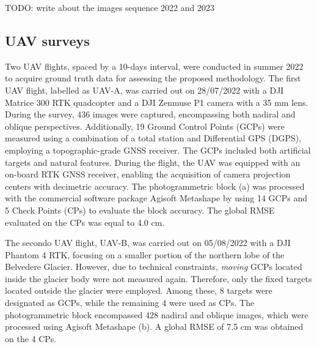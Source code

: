   {\color{red} TODO: write about the images sequence 2022 and 2023}

\subsection{UAV surveys}\label{sec:4:uavsurveys}

Two UAV flights, spaced by a 10-days interval, were conducted in summer 2022 to acquire
ground truth data for assessing the proposed methodology.
The first UAV flight, labelled as UAV-A, was carried out on 28/07/2022 with a DJI
Matrice 300 RTK quadcopter and a DJI Zenmuse P1 camera with a 35 mm lens.
During the survey, 436 images were captured, encompassing both nadiral and oblique
perspectives.
Additionally, 19 Ground Control Points (GCPs) were measured using a combination of a
total station and Differential GPS (DGPS), employing a topographic-grade
GNSS receiver.
The GCPs included both artificial targets and natural features.
During the flight, the UAV was equipped with an on-board RTK GNSS receiver, enabling the
acquisition of camera projection centers with decimetric accuracy.
The photogrammetric block (a) was processed with the commercial
software package Agisoft Metashape \citep{agisoft} by using 14 GCPs and 5 Check Points
(CPs) to evaluate the block accuracy.
The global RMSE evaluated on the CPs was equal to 4.0 cm.

The secondo UAV flight, UAV-B, was carried out on 05/08/2022 with a DJI Phantom
4 RTK, focusing on a smaller portion of the northern lobe of the Belvedere Glacier.
However, due to technical constraints, \textit{moving} GCPs located inside the
glacier body were not measured again.
Therefore, only the fixed targets located outside the glacier were employed.
Among these, 8 targets were designated as GCPs, while the remaining 4 were used as CPs.
The photogrammetric block encompassed 428 nadiral and oblique images, which
were processed using Agisoft Metashape (b).
A global RMSE of 7.5 cm was obtained on the 4 CPs.

